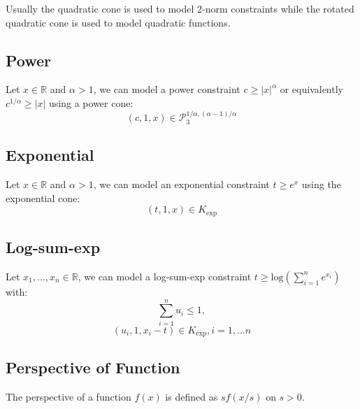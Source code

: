 \documentclass{article}
\begin{document}
Usually the quadratic cone is used to model 2-norm constraints while the
rotated quadratic cone is used to model quadratic functions.

\subsection{Power}
Let $x\in \mathbb{R}$ and $\alpha>1$, we can model a power constraint
$c \geq |x|^\alpha$ or equivalently $c^{1/\alpha}\geq|x|$ using a power
cone:
$$(c,1,x) \in \mathcal{P}_3^{1/\alpha,(\alpha-1)/\alpha}$$

\subsection{Exponential}
Let $x\in\mathbb{R}$ and $\alpha>1$, we can model an exponential
constraint $t\geq e^x$ using the exponential cone:
$$(t,1,x)\in K_\text{exp}$$

\subsection{Log-sum-exp}
Let $x_1,...,x_n \in \mathbb{R}$, we can model a log-sum-exp
constraint $t\geq \text{log}(\sum^n_{i=1}e^{x_i})$ with:
$$\sum^n_{i=1}u_i \leq 1,$$
$$(u_i,1,x_i-t) \in K_\text{exp}, i=1,...n$$

\subsection{Perspective of Function}
The perspective of a function $f(x)$ is defined as $sf(x/s)$ on $s>0$.
\end{document}
